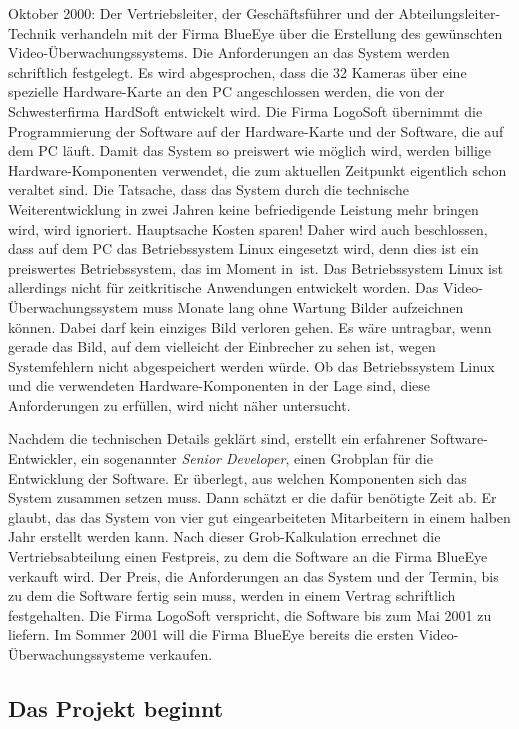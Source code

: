 Oktober 2000: Der Vertriebsleiter, der Geschäftsführer und der
Abteilungsleiter-Technik verhandeln mit der Firma BlueEye über die Erstellung
des gewünschten Video-Überwachungssystems. Die Anforderungen an das System
werden schriftlich festgelegt. Es wird abgesprochen, dass die 32 Kameras über
eine spezielle Hardware-Karte an den PC angeschlossen werden, die von der
Schwesterfirma HardSoft entwickelt wird. Die Firma LogoSoft übernimmt die
Programmierung der Software auf der Hardware-Karte und der Software, die auf
dem PC läuft. Damit das System so preiswert wie möglich wird, werden billige
Hardware-Komponenten verwendet, die zum aktuellen Zeitpunkt eigentlich schon
veraltet sind. Die Tatsache, dass das System durch die technische
Weiterentwicklung in zwei Jahren keine befriedigende Leistung mehr bringen
wird, wird ignoriert. Hauptsache Kosten sparen! Daher wird auch beschlossen,
dass auf dem PC das Betriebssystem Linux eingesetzt wird, denn dies ist ein
preiswertes Betriebssystem, das im Moment \glqq in\grqq\ ist. Das Betriebssystem
Linux ist allerdings nicht für zeitkritische Anwendungen entwickelt worden. Das
Video-Überwachungssystem muss Monate lang ohne Wartung Bilder aufzeichnen
können. Dabei darf kein einziges Bild verloren gehen. Es wäre untragbar, wenn
gerade das Bild, auf dem vielleicht der Einbrecher zu sehen ist, wegen
Systemfehlern nicht abgespeichert werden würde. Ob das Betriebssystem Linux und
die verwendeten Hardware-Komponenten in der Lage sind, diese Anforderungen zu
erfüllen, wird nicht näher untersucht.

Nachdem die technischen Details geklärt sind, erstellt ein erfahrener
Software-Entwickler, ein sogenannter {\em Senior Developer}, einen Grobplan für
die Entwicklung der Software. Er überlegt, aus welchen Komponenten sich das
System zusammen setzen muss. Dann schätzt er die dafür benötigte Zeit ab. Er
glaubt, das das System von vier gut eingearbeiteten Mitarbeitern in einem
halben Jahr erstellt werden kann. Nach dieser Grob-Kalkulation errechnet die
Vertriebsabteilung einen Festpreis, zu dem die Software an die Firma BlueEye
verkauft wird. Der Preis, die Anforderungen an das System und der Termin, bis
zu dem die Software fertig sein muss, werden in einem Vertrag schriftlich
festgehalten. Die Firma LogoSoft verspricht, die Software bis zum Mai 2001 zu
liefern. Im Sommer 2001 will die Firma BlueEye bereits die ersten
Video-Überwachungssysteme verkaufen.

\subsection{Das Projekt beginnt}

